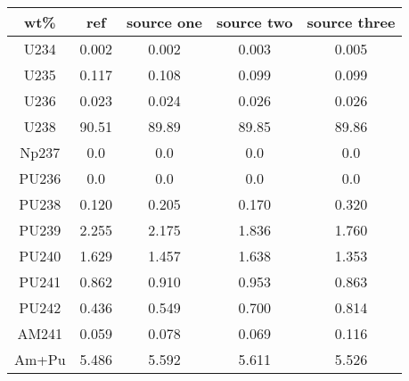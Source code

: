 	\begin{tabular}{ccccc}
		\hline
		\textbf{wt\%} & \textbf{ref} & \textbf{source one} & \textbf{source two} & \textbf{source three} \\ 
		\hline
		U234 & 0.002 & 0.002 & 0.003 & 0.005 \\ 
		U235 & 0.117 & 0.108 & 0.099 & 0.099 \\ 
		U236 & 0.023 & 0.024 & 0.026 & 0.026 \\ 
		U238 & 90.51 & 89.89 & 89.85 & 89.86 \\ 
		Np237 & 0.0 & 0.0 & 0.0 & 0.0 \\ 
		PU236 & 0.0 & 0.0 & 0.0 & 0.0 \\ 
		PU238 & 0.120 & 0.205 & 0.170 & 0.320 \\ 
		PU239 & 2.255 & 2.175 & 1.836 & 1.760 \\ 
		PU240 & 1.629 & 1.457 & 1.638 & 1.353 \\ 
		PU241 & 0.862 & 0.910 & 0.953 & 0.863 \\ 
		PU242 & 0.436 & 0.549 & 0.700 & 0.814 \\ 
		AM241 & 0.059 & 0.078 & 0.069 & 0.116 \\ 
		\hline
		\hline
		Am+Pu & 5.486 & 5.592 & 5.611 & 5.526 \\ 
		\hline 
	\end{tabular} 
